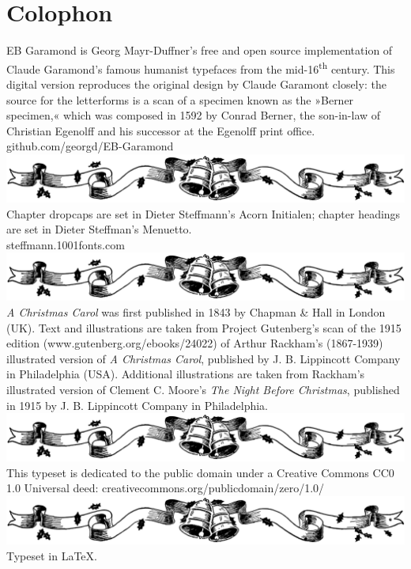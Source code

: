 \documentclass[
a5paper,
BCOR=7mm,
twoside,
DIV=calc,
fontsize=12pt,
usegeometry,
dottedtocline,
headers=normal,
listof=numbered,
listof=totoc,
listof=flat,
listof=nochaptergap]{scrbook} %
\begin{document}
\renewcommand*{\chaptermarkformat}{}
\renewcommand*{\chapterheadendvskip}{\vspace{10pt}}
\renewcommand*{\chapterheadstartvskip}{\vspace{0pt}}



\mainmatter
\flushbottom
{}







\cleardoublepage
{}
\chapter*{Colophon}

\centering
EB Garamond is Georg Mayr-Duffner's free and open source implementation of Claude Garamond’s famous humanist typefaces from the mid-16\textsuperscript{th} century. This digital version reproduces the original design by Claude Garamont closely: the source for the letterforms is a scan of a specimen known as the »Berner specimen,« which was composed in 1592 by Conrad Berner, the son-in-law of Christian Egenolff and his successor at the Egenolff print office.\\github.com/georgd/EB-Garamond
\vfill
\includegraphics[width=.4\textwidth]{bells}
\vfill
Chapter dropcaps are set in Dieter Steffmann's Acorn Initialen; chapter headings are set in Dieter Steffman's Menuetto.\\steffmann.1001fonts.com
\vfill
\includegraphics[width=.4\textwidth]{bells}
\vfill
\textit{A Christmas Carol} was first published in 1843 by Chapman \& Hall in London (UK). Text and illustrations are taken from Project Gutenberg's scan of the 1915 edition (www.gutenberg.org/ebooks/24022) of Arthur Rackham's (1867-1939) illustrated version of \textit{A Christmas Carol}, published by J. B. Lippincott Company in Philadelphia (USA). Additional illustrations are taken from Rackham's illustrated version of Clement C. Moore's \textit{The Night Before Christmas}, published in 1915 by J. B. Lippincott Company in Philadelphia.
\vfill
\includegraphics[width=.4\textwidth]{bells}
\vfill
This typeset is dedicated to the public domain under a Creative Commons CC0 1.0 Universal deed: creativecommons.org/publicdomain/zero/1.0/
\vfill
\includegraphics[width=.4\textwidth]{bells}
\vfill
Typeset in \LaTeX{}.
\thispagestyle{empty}
\end{document}
